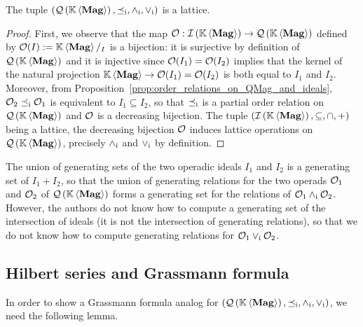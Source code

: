 \begin{Theorem} \label{thm:lattice_structure_of_QMag}
  The tuple $\LatQMag$ is a lattice.
\end{Theorem}
\begin{proof}
  First, we observe that the map $\Oca:\IMag\to\QMag$ defined by
  $\Oca(I) :=\KMag/_I$ is a bijection: it is surjective by definition of
  $\QMag$ and it is injective since $\Oca(I_1)=\Oca(I_2)$ implies that
  the kernel of the natural projection $\KMag\to\Oca(I_1)=\Oca(I_2)$ is
  both equal to $I_1$ and $I_2$. Moreover, from
  Proposition~\ref{prop:order_relations_on_QMag_and_ideals},
  $\Oca_2\OrdQMag\Oca_1$ is equivalent to $I_1\subseteq I_2$, so that
  $\OrdQMag$ is a partial order relation on $\QMag$ and $\Oca$ is a
  decreasing bijection. The tuple $\left(\IMag,\subseteq,\cap,+\right)$
  being a lattice, the decreasing bijection $\Oca$ induces lattice
  operations on $\QMag$, precisely $\InfQMag$ and $\SupQMag$ by
  definition.
\end{proof}
\medbreak

The union of generating sets of the two operadic ideals $I_1$ and $I_2$
is a generating set of $I_1+I_2$, so that the union of generating
relations for the two operads $\Oca_1$ and $\Oca_2$ of $\QMag$ forms a
generating set for the relations of $\Oca_1\InfQMag\Oca_2$. However, the
authors do not know how to compute a generating set of the intersection
of ideals (it is not the intersection of generating relations), so that
we do not know how to compute generating relations for
$\Oca_1\SupQMag\Oca_2$.
\medbreak
\subsection{Hilbert series and Grassmann formula}
In order to show a Grassmann formula analog for $\LatQMag$, we need the
following lemma.
\medbreak

